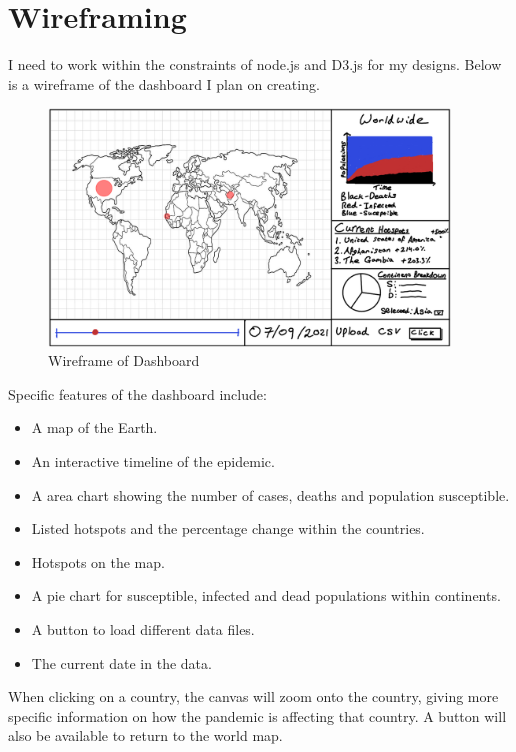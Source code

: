 \documentclass{report}
\begin{document}
\section{Wireframing}
I need to work within the constraints of node.js and D3.js for my designs. Below is a wireframe of the dashboard I plan on creating.\\
\begin{center}
    \begin{figure}[h]
        \centering
        \includegraphics[width=0.95\textwidth]{Images/Home_Wireframe.png}
        \caption{Wireframe of Dashboard}
        \label{fig:wireframe_world}
    \end{figure}
\end{center}
Specific features of the dashboard include:
\begin{itemize}
    \item A map of the Earth.
    \item An interactive timeline of the epidemic.
    \item A area chart showing the number of cases, deaths and population susceptible.
    \item Listed hotspots and the percentage change within the countries.
    \item Hotspots on the map.
    \item A pie chart for susceptible, infected and dead populations within continents.
    \item A button to load different data files.
    \item The current date in the data.
\end{itemize}
When clicking on a country, the canvas will zoom onto the country, giving more specific information on how the pandemic is affecting that country. A button will also be available to return to the world map.
\end{document}
